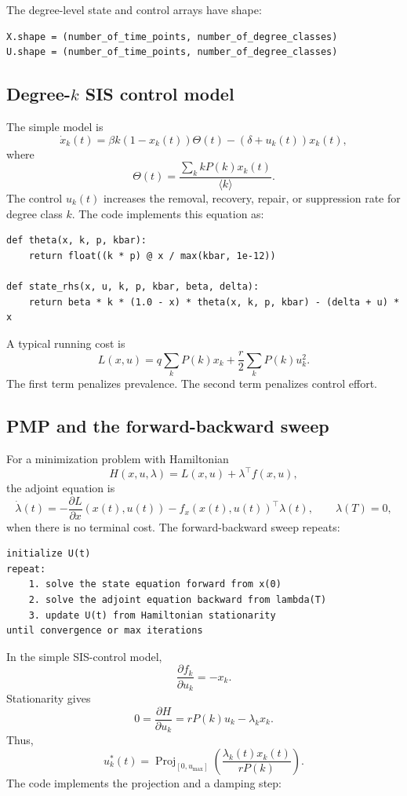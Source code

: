 \documentclass[11pt,a4paper]{article}
\newcommand{\Proj}{\operatorname{Proj}}
\begin{document}
The degree-level state and control arrays have shape:

\begin{lstlisting}[style=text]
X.shape = (number_of_time_points, number_of_degree_classes)
U.shape = (number_of_time_points, number_of_degree_classes)
\end{lstlisting}

\subsection{Degree-\(k\) SIS control model}

The simple model is
\[
  \dot{x}_k(t)
  =\beta k(1-x_k(t))\Theta(t)
  -(\delta+u_k(t))x_k(t),
\]
where
\[
  \Theta(t)=\frac{\sum_k kP(k)x_k(t)}{\langle k\rangle}.
\]
The control \(u_k(t)\) increases the removal, recovery, repair, or suppression rate for degree class \(k\). The code implements this equation as:

\begin{lstlisting}[style=py]
def theta(x, k, p, kbar):
    return float((k * p) @ x / max(kbar, 1e-12))

def state_rhs(x, u, k, p, kbar, beta, delta):
    return beta * k * (1.0 - x) * theta(x, k, p, kbar) - (delta + u) * x
\end{lstlisting}

A typical running cost is
\[
  L(x,u)=q\sum_k P(k)x_k+\frac{r}{2}\sum_kP(k)u_k^2.
\]
The first term penalizes prevalence. The second term penalizes control effort.

\subsection{PMP and the forward-backward sweep}

For a minimization problem with Hamiltonian
\[
  H(x,u,\lambda)=L(x,u)+\lambda^\top f(x,u),
\]
the adjoint equation is
\[
  \dot{\lambda}(t)
  =-\frac{\partial L}{\partial x}(x(t),u(t))
   -f_x(x(t),u(t))^\top\lambda(t),
  \qquad
  \lambda(T)=0,
\]
when there is no terminal cost. The forward-backward sweep repeats:

\begin{lstlisting}[style=text]
initialize U(t)
repeat:
    1. solve the state equation forward from x(0)
    2. solve the adjoint equation backward from lambda(T)
    3. update U(t) from Hamiltonian stationarity
until convergence or max iterations
\end{lstlisting}

In the simple SIS-control model,
\[
  \frac{\partial f_k}{\partial u_k}=-x_k.
\]
Stationarity gives
\[
  0=\frac{\partial H}{\partial u_k}
   = rP(k)u_k-\lambda_kx_k.
\]
Thus,
\[
  u_k^*(t)
  =\Proj_{[0,u_{\max}]}
  \left(
    \frac{\lambda_k(t)x_k(t)}{rP(k)}
  \right).
\]
The code implements the projection and a damping step:
\end{document}

